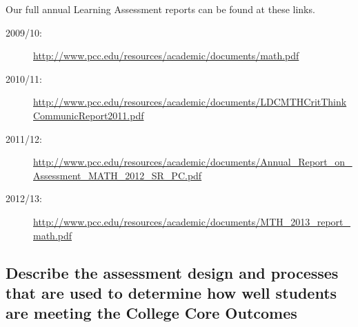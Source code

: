 Our full annual Learning Assessment reports can be found at these links. 
\begin{description}
\item[2009/10:] \url{http://www.pcc.edu/resources/academic/documents/math.pdf}
\item[2010/11:] \url{http://www.pcc.edu/resources/academic/documents/LDCMTHCritThinkCommunicReport2011.pdf}
\item[2011/12:] \url{http://www.pcc.edu/resources/academic/documents/Annual_Report_on_Assessment_MATH_2012_SR_PC.pdf}
\item[2012/13:] \url{http://www.pcc.edu/resources/academic/documents/MTH_2013_report_math.pdf}
\end{description}

\subsection{Describe the assessment design and processes that are used to determine how well students are meeting the College Core Outcomes}

